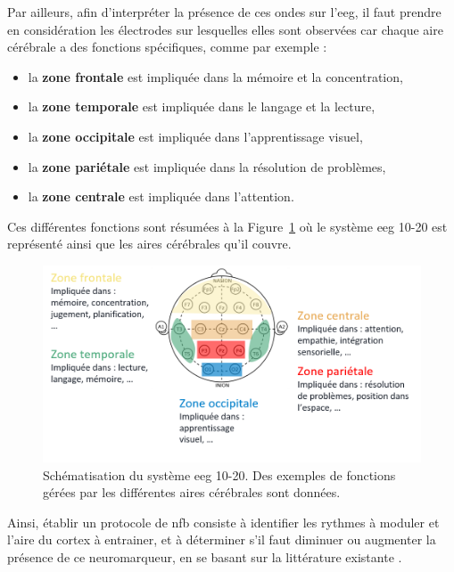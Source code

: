 Par ailleurs, afin d'interpréter la présence de ces ondes sur l'\gls{eeg}, il faut prendre en considération les électrodes sur lesquelles elles sont observées 
car chaque aire cérébrale a des fonctions spécifiques, comme par exemple \citep{Marzbani2016} :
\begin{itemize}
\item la \textbf{zone frontale} est impliquée dans la mémoire et la concentration,
\item la \textbf{zone temporale} est impliquée dans le langage et la lecture,
\item la \textbf{zone occipitale} est impliquée dans l'apprentissage visuel,
\item la \textbf{zone pariétale} est impliquée dans la résolution de problèmes,
\item la \textbf{zone centrale} est impliquée dans l'attention.
\end{itemize}

Ces différentes fonctions sont résumées à la Figure~\ref{Figure:introduction_cortical_areas_and_functions} où le système \gls{eeg} 10-20 est représenté ainsi
que les aires cérébrales qu'il couvre.

\begin{figure}[h!]
  \centering
	\includegraphics[width=1\linewidth]{figures/chapter-1/introduction_cortical_areas_and_functions} 
  \caption{Schématisation du système \gls{eeg} 10-20. Des exemples de fonctions gérées par les différentes aires cérébrales sont données. }
  \label{Figure:introduction_cortical_areas_and_functions}
\end{figure}

Ainsi, établir un protocole de \gls{nfb} consiste à identifier les rythmes à moduler et l'aire 
du cortex à entrainer, et à déterminer s'il faut diminuer ou augmenter la présence de ce neuromarqueur, en se basant sur la littérature 
existante \citep{Micoulaud2019}.

